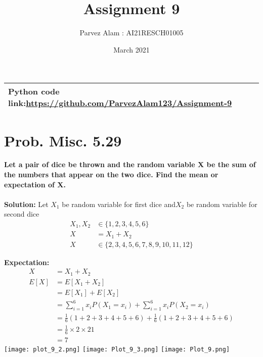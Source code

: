 \documentclass{article}
\title{Assignment 9}
\author{Parvez Alam : AI21RESCH01005 }
\date{March 2021}
\begin{document}
\maketitle
\begin{multicols}{2}
\begin{center}
    \begin{tabular}{|p{5cm}|}
    \hline
        Python code link:\url{https://github.com/ParvezAlam123/Assignment-9} \\
        \hline
    \end{tabular}
\end{center}


\section{Prob. Misc. 5.29}
\textbf{Let a pair of dice be thrown and the random variable X be the sum of the numbers that appear on the two dice. Find the mean or expectation of X.} \\ \\
\textbf{Solution:} 
Let \(X_1\) be random variable for first dice and\( X_2\) be random variable for second dice
\begin{align}
    X_1, X_2 &\in \{1,2,3,4,5,6\}  \nonumber \\
    X &= X_1+X_2 \nonumber  \nonumber \\
    X &\in \{2,3,4,5,6,7,8,9,10,11,12\} \nonumber 
\end{align}

\textbf{Expectation:} \\
\begin{align}
    X &=X_1+X_2 \nonumber \\
    E[X] &=E[X_1+X_2] \nonumber \\
         &=E[X_1]+E[X_2] \nonumber \\
         &=\sum _{i=1}^6x_iP(X_1=x_i)+\sum _{i=1}^6x_iP(X_2=x_i) \nonumber \\
         &=\frac{1}{6}(1+2+3+4+5+6)+\frac{1}{6}(1+2+3+4+5+6) \nonumber \\
         &=\frac{1}{6}\times 2 \times 21 \nonumber \\
         &=7 \nonumber
\end{align}
\texttt{[image: plot\_9\_2.png]}
\texttt{[image: Plot\_9\_3.png]}
\texttt{[image: Plot\_9.png]}



\end{multicols}
\end{document}
